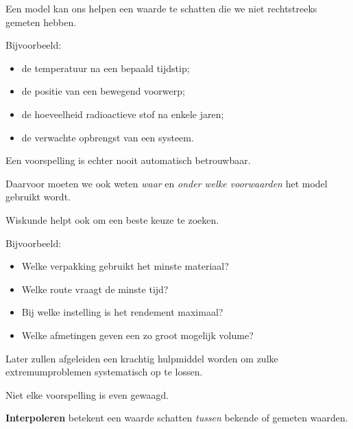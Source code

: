 \documentclass{ximera}
\begin{document}
Een model kan ons helpen een waarde te schatten die we niet rechtstreeks
gemeten hebben.

Bijvoorbeeld:

\begin{itemize}
  \item de temperatuur na een bepaald tijdstip;
  \item de positie van een bewegend voorwerp;
  \item de hoeveelheid radioactieve stof na enkele jaren;
  \item de verwachte opbrengst van een systeem.
\end{itemize}

Een voorspelling is echter nooit automatisch betrouwbaar.

Daarvoor moeten we ook weten \emph{waar} en \emph{onder welke
voorwaarden} het model gebruikt wordt.




Wiskunde helpt ook om een beste keuze te zoeken.

Bijvoorbeeld:

\begin{itemize}
  \item Welke verpakking gebruikt het minste materiaal?
  \item Welke route vraagt de minste tijd?
  \item Bij welke instelling is het rendement maximaal?
  \item Welke afmetingen geven een zo groot mogelijk volume?
\end{itemize}

Later zullen afgeleiden een krachtig hulpmiddel worden om zulke
extremumproblemen systematisch op te lossen.




Niet elke voorspelling is even gewaagd.

\begin{definitie}[Interpoleren]

\textbf{Interpoleren} betekent een waarde schatten
\emph{tussen} bekende of gemeten waarden.

\end{definitie}
\end{document}
